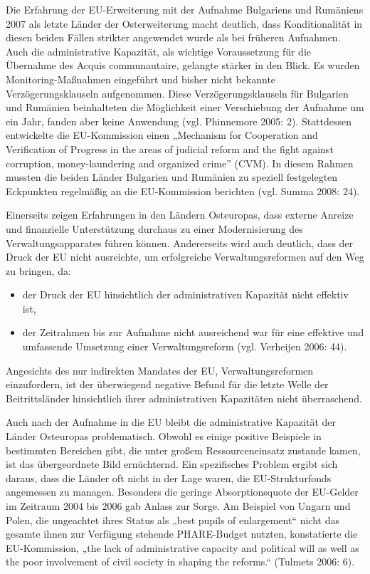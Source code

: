 Die Erfahrung der EU-Erweiterung mit der Aufnahme Bulgariens und Rumäniens 2007 als letzte Länder der Osterweiterung macht deutlich, dass Konditionalität in diesen beiden Fällen strikter angewendet wurde als bei früheren Aufnahmen. Auch die administrative Kapazität, als wichtige Voraussetzung für die Übernahme des Acquis communautaire, gelangte stärker in den Blick. Es wurden Monitoring-Maßnahmen eingeführt und bisher nicht bekannte Verzögerungsklauseln aufgenommen. Diese Verzögerungsklauseln für Bulgarien und Rumänien beinhalteten die Möglichkeit einer Verschiebung der Aufnahme um ein Jahr, fanden aber keine Anwendung (vgl. Phinnemore 2005: 2). Stattdessen entwickelte die EU-Kommission einen „Mechanism for Cooperation and Verification of Progress in the areas of judicial reform and the fight against corruption, money-laundering and organized crime” (CVM). In diesem Rahmen mussten die beiden Länder Bulgarien und Rumänien zu speziell festgelegten Eckpunkten regelmäßig an die EU-Kommission berichten (vgl. Summa 2008: 24). 
\par
Einerseits zeigen Erfahrungen in den Ländern Osteuropas, dass externe Anreize und finanzielle Unterstützung durchaus zu einer Modernisierung des Verwaltungsapparates führen können. Andererseits wird auch deutlich, dass der Druck der EU nicht ausreichte, um erfolgreiche Verwaltungsreformen auf den Weg zu bringen, da:
\begin{itemize}
\item der Druck der EU hinsichtlich der administrativen Kapazität nicht effektiv ist, 
\item der Zeitrahmen bis zur Aufnahme nicht ausreichend war für eine effektive und umfassende Umsetzung einer Verwaltungsreform (vgl. Verheijen 2006: 44).
\end{itemize}
Angesichts des nur indirekten Mandates der EU, Verwaltungsreformen einzufordern, ist der überwiegend negative Befund für die letzte Welle der Beitrittsländer hinsichtlich ihrer administrativen Kapazitäten nicht überraschend.\par
Auch nach der Aufnahme in die EU bleibt die administrative Kapazität der Länder Osteuropas problematisch. Obwohl es einige positive Beispiele in bestimmten Bereichen gibt, die unter großem Ressourceneinsatz zustande kamen, ist das übergeordnete Bild ernüchternd. Ein spezifisches Problem ergibt sich daraus, dass die Länder oft nicht in der Lage waren, die EU-Strukturfonds angemessen zu managen. Besonders die geringe Absorptionsquote der EU-Gelder im Zeitraum 2004 bis 2006 gab Anlass zur Sorge. Am Beispiel von Ungarn und Polen, die ungeachtet ihres Status als „best pupils of enlargement“ nicht das gesamte ihnen zur Verfügung stehende PHARE-Budget nutzten, konstatierte die EU-Kommission, „the lack of administrative capacity and political will as well as the poor involvement of civil society in shaping the reforms.“ (Tulmets 2006: 6).\par
